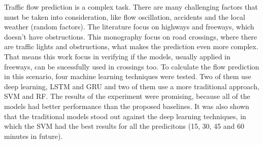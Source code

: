 Traffic flow prediction is a complex task. There are many challenging factors that must be taken into consideration, like flow oscillation, accidents and the local weather (random factors). The literature focus on highways and freeways, which doesn't have obstructions. This monography focus on road crossings, where there are traffic lights and obstructions, what makes the prediction even more complex. That means this work focus in verifying if the models, usually applied in freeways, can be sucessfully used in crossings too. To calculate the flow prediction in this scenario, four machine learning techniques were tested. Two of them use deep learning, \acrfull{LSTM} and \acrfull{GRU} and two of them use a more traditional approach, \acrfull{SVM} and \acrfull{RF}. The results of the experiment were promising, because all of the models had better performance than the proposed baselines. It was also shown that the traditional models stood out against the deep learning techniques, in which the \acrfull{SVM} had the best results for all the predicitons (15, 30, 45 and 60 minutes in future).
